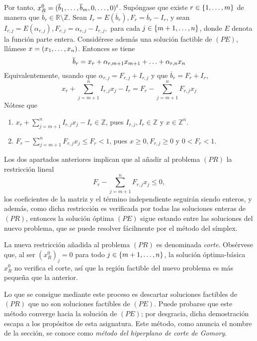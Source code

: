 \documentclass[11pt]{report}
\theoremstyle{mytheorem}
\theoremstyle{mydefinition}
\theoremstyle{myexample}
\newcommand{\R}{\mathbb R}
\newcommand{\Z}{\mathbb Z}
\begin{document}
Por tanto, $x^0_R = (\overline{b}_1,\mathellipsis,\overline{b}_m,0,\mathellipsis,0)^t$. Supóngase que existe $r \in \{1,\mathellipsis,m\}$ de manera que $\overline{b}_r \in \R \setminus \Z$. Sean $I_r=E(\overline{b}_r), F_r = \overline{b}_r-I_r$, y sean $I_{r,j}=E(\alpha_{r,j}), F_{r,j} = \alpha_{r,j}-I_{r,j},$ para cada $j \in \{m+1,\mathellipsis,n\}$, donde $E$ denota la función parte entera. Considérese además una solución factible de $(PE)$, llámese $x = (x_1,\mathellipsis,x_n)$. Entonces se tiene
\[\overline{b}_r = x_r+\alpha_{r,m+1}x_{m+1}+\mathellipsis+\alpha_{r,n}x_n\]
Equivalentemente, usando que $\alpha_{r,j} = F_{r,j}+I_{r,j}$ y que $\overline{b}_r = F_r+I_r$,
\[x_r+\sum_{j=m+1}^nI_{r,j}x_j-I_r = F_r-\sum_{j=m+1}^nF_{r,j}x_j\]
Nótese que
\begin{enumerate}
    \item $\displaystyle{x_r+\sum_{j=m+1}^nI_{r,j}x_j-I_r \in \Z}$, pues $I_{r,j},I_r \in \Z$ y $x \in \Z^n$.
    \item $\displaystyle{F_r-\sum_{j=m+1}^nF_{r,j}x_j \leq F_r < 1}$, pues $x \geq 0, F_{r,j} \geq 0$ y $ 0 < F_r <1$.
\end{enumerate}
Los dos apartados anteriores implican que al añadir al problema $(PR)$ la restricción lineal
\[F_r-\sum_{j=m+1}^nF_{r,j}x_j \leq 0,\]
los coeficientes de la matriz y el término independiente seguirán siendo enteros, y además, como dicha restricción es verificada por todas las soluciones enteras de $(PR)$, entonces la solución óptima $(PE)$ sigue estando entre las soluciones del nuevo problema, que se puede resolver fácilmente por el método del símplex. 



La nueva restricción añadida al problema $(PR)$ es denominada {\textit{corte}}. Obsérvese que, al ser $(x^0_R)_j = 0$ para todo $j \in \{m+1,\mathellipsis,n\}$, la solución óptima-básica $x^0_R$ no verifica el corte, así que la región factible del nuevo problema es más pequeña que la anterior.



Lo que se consigue mediante este proceso es descartar soluciones factibles de $(PR)$ que no son soluciones factibles de $(PE)$. Puede probarse que este método converge hacia la solución de $(PE)$; por desgracia, dicha demostración escapa a los propósitos de esta asignatura. Este método, como anuncia el nombre de la sección, se conoce como {\textit{método del hiperplano de corte de Gomory}}.
\end{document}
